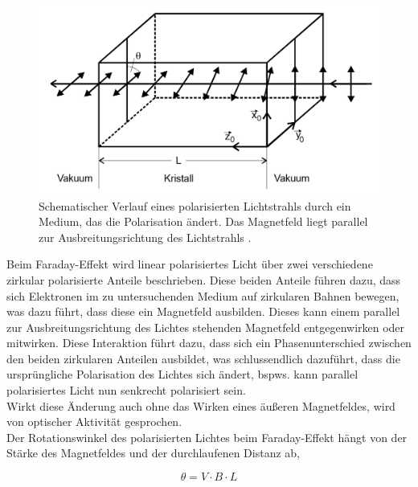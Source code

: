 \begin{figure}[H]
    \centering
    \includegraphics[width=\textwidth]{Bilder/faradayeffekt.png}
    \caption{Schematischer Verlauf eines polarisierten Lichtstrahls durch ein Medium, das die Polarisation ändert. Das Magnetfeld liegt parallel zur Ausbreitungsrichtung des Lichtstrahls \cite{anhang}.}
    \label{fig:faradayeffekt}
\end{figure}
Beim Faraday-Effekt wird linear polarisiertes Licht über zwei verschiedene zirkular polarisierte Anteile beschrieben. Diese beiden Anteile führen dazu, dass sich Elektronen im zu untersuchenden Medium auf zirkularen Bahnen bewegen, was dazu führt, dass diese ein Magnetfeld ausbilden.
Dieses kann einem parallel zur Ausbreitungsrichtung des Lichtes stehenden Magnetfeld entgegenwirken oder mitwirken. Diese Interaktion führt dazu, dass sich ein Phasenunterschied zwischen den beiden zirkularen Anteilen ausbildet,
was schlussendlich dazuführt, dass die ursprüngliche Polarisation des Lichtes sich ändert, bspws. kann parallel polarisiertes Licht nun senkrecht polarisiert sein. \\
Wirkt diese Änderung auch ohne das Wirken eines äußeren Magnetfeldes, wird von optischer Aktivität gesprochen. \\
Der Rotationswinkel des polarisierten Lichtes beim Faraday-Effekt hängt von der Stärke des Magnetfeldes und der durchlaufenen Distanz ab,

\begin{equation*}
    \theta = V \cdot B \cdot L 
    \label{eq:verdet}
\end{equation*}

